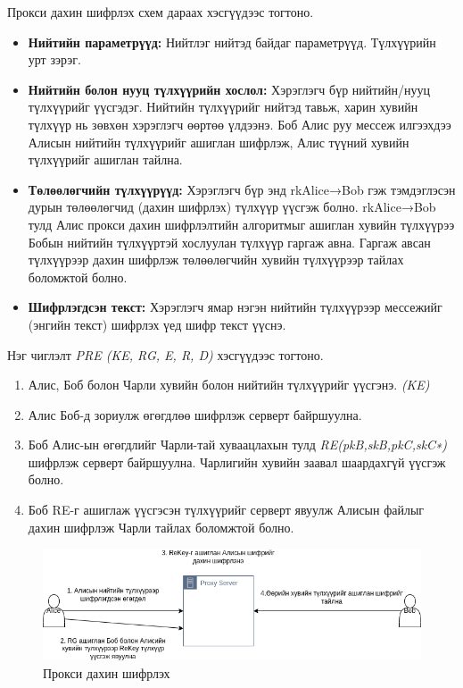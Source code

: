 Прокси дахин шифрлэх схем дараах хэсгүүдээс тогтоно.
\begin{itemize}
    \item \textbf{Нийтийн параметрүүд:} Нийтлэг нийтэд байдаг параметрүүд. Түлхүүрийн урт зэрэг.

    \item \textbf{Нийтийн болон нууц түлхүүрийн хослол:} Хэрэглэгч бүр нийтийн/нууц түлхүүрийг үүсгэдэг. Нийтийн түлхүүрийг нийтэд тавьж, харин хувийн түлхүүр нь зөвхөн хэрэглэгч өөртөө үлдээнэ. Боб Алис руу мессеж илгээхдээ Алисын нийтийн түлхүүрийг ашиглан шифрлэж, Алис түүний хувийн түлхүүрийг ашиглан тайлна.

    \item \textbf{Төлөөлөгчийн түлхүүрүүд:} Хэрэглэгч бүр энд rkAlice→Bob гэж тэмдэглэсэн дурын төлөөлөгчид (дахин шифрлэх) түлхүүр үүсгэж болно. rkAlice→Bob тулд Алис прокси дахин шифрлэлтийн алгоритмыг ашиглан хувийн түлхүүрээ Бобын нийтийн түлхүүртэй хослуулан түлхүүр гаргаж авна. Гаргаж авсан түлхүүрээр дахин шифрлэж төлөөлөгчийн хувийн түлхүүрээр тайлах боломжтой болно.

    \item \textbf{Шифрлэгдсэн текст:} Хэрэглэгч ямар нэгэн нийтийн түлхүүрээр мессежийг (энгийн текст) шифрлэх үед шифр текст үүснэ.
\end{itemize}

Нэг чиглэлт \emph{PRE (KE, RG, E, R, D)} хэсгүүдээс тогтоно.
\begin{enumerate}
    \item Алис, Боб болон Чарли хувийн болон нийтийн түлхүүрийг үүсгэнэ. \emph{(KE)}
    \item Алис Боб-д зориулж өгөгдлөө шифрлэж серверт байршуулна.
    \item Боб Алис-ын өгөгдлийг Чарли-тай хуваацлахын тулд \emph{RE(pkB,skB,pkC,skC∗)} шифрлэж серверт байршуулна. Чарлигийн хувийн заавал шаардахгүй үүсгэж болно.
    \item Боб RE-г ашиглаж үүсгэсэн түлхүүрийг серверт явуулж Алисын файлыг дахин шифрлэж Чарли тайлах боломжтой болно.
\end{enumerate}

\begin{figure}[ht]
    \centering
    \includegraphics[scale=0.5]{Figures/PRE.drawio.png}
    \caption[Proxy Re-encryption scheme]{Прокси дахин шифрлэх}
    \label{fig:PRE_Scheme}
\end{figure}

